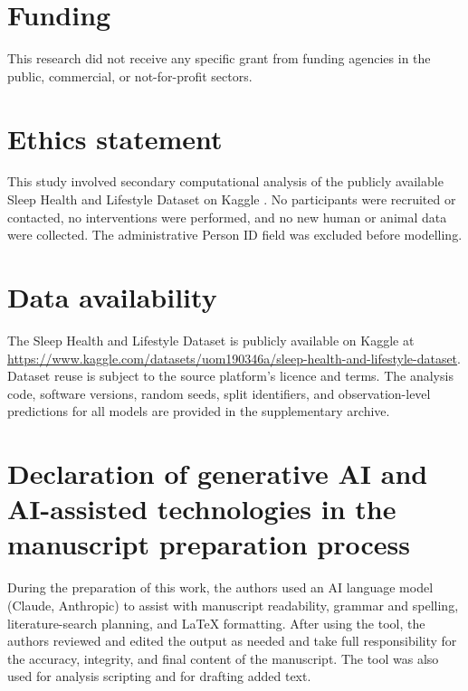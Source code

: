 \documentclass[a4paper,fleqn]{cas-dc}
\begin{document}
\section*{Funding}

This research did not receive any specific grant from funding agencies in the public, commercial, or not-for-profit sectors.

\section*{Ethics statement}

This study involved secondary computational analysis of the publicly available Sleep Health and Lifestyle Dataset on Kaggle \cite{kaggle2023}. No participants were recruited or contacted, no interventions were performed, and no new human or animal data were collected. The administrative Person ID field was excluded before modelling.

\section*{Data availability}

The Sleep Health and Lifestyle Dataset is publicly available on Kaggle at \url{https://www.kaggle.com/datasets/uom190346a/sleep-health-and-lifestyle-dataset}. Dataset reuse is subject to the source platform's licence and terms. The analysis code, software versions, random seeds, split identifiers, and observation-level predictions for all models are provided in the supplementary archive.

\section*{Declaration of generative AI and AI-assisted technologies in the manuscript preparation process}
During the preparation of this work, the authors used an AI language model (Claude, Anthropic) to assist with manuscript readability, grammar and spelling, literature-search planning, and LaTeX formatting. After using the tool, the authors reviewed and edited the output as needed and take full responsibility for the accuracy, integrity, and final content of the manuscript. The tool was also used for analysis scripting and for drafting added text.
\end{document}
